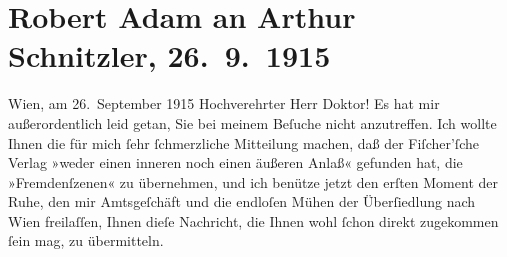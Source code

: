 

         
         \renewcommand{\erwaehntePersonen}{Personen: Robert Adam}
         \renewcommand{\erwaehnteInstitutionen}{Institutionen: Bezirksgericht Wien Floridsdorf, S. Fischer Verlag}
         \renewcommand{\erwaehnteOrte}{Orte: Meidlinger Hauptstraße, Wien, XII., Meidling, XXI., Floridsdorf, Zistersdorf}
         \renewcommand{\erwaehnteWerke}{Werke: Der Fremde}
               \section[Robert Adam an Arthur Schnitzler, 26. 9. 1915]{ Robert Adam an Arthur Schnitzler, 26. 9. 1915}\nopagebreak{}\rehead{ }\begin{ledgroupsized}[t]{13cm}\normalsize\beginnumbering{} \toendnotes[C]{\smallbreak\pagebreak[2]} 
\pstart
           \raggedleft{}{\pb}Wien, am 26. September 1915\pend
           \pstart{}Hochverehrter Herr Doktor!\pend\pstart
           Es hat mir außerordentlich leid getan, Sie bei meinem Beſuche nicht anzutreffen. Ich
               wollte Ihnen die für mich ſehr ſchmerzliche Mitteilung machen, daß der Fiſcher’ſche Verlag »weder einen inneren noch
               einen äußeren Anlaß« gefunden hat, die »Fremdenſzenen« zu übernehmen, und ich benütze jetzt den erſten Moment der
               Ruhe, den mir Amtsgeſchäft und die endloſen Mühen der Überſiedlung nach Wien freilaſſen, Ihnen dieſe Nachricht, die Ihnen
               wohl ſchon direkt zugekommen ſein mag, zu übermitteln.\pend

\end{ledgroupsized}
